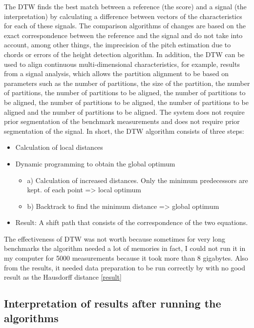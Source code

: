 \documentclass{article}
\begin{document}
 The DTW finds the best match between a reference (the score) and a signal (the interpretation) by calculating a difference between vectors of the characteristics for each of these signals. The comparison algorithms of changes are based on the exact correspondence between the reference and the signal and do not take into account, among other things, the imprecision of the pitch estimation due to chords or errors of the height detection algorithm. In addition, the DTW can be used to align continuous multi-dimensional characteristics, for example, results from a signal analysis, which allows the partition alignment to be based on parameters such as the number of partitions, the size of the partition, the number of partitions, the number of partitions to be aligned, the number of partitions to be aligned, the number of partitions to be aligned, the number of partitions to be aligned and the number of partitions to be aligned.
The system does not require prior segmentation of the benchmark measurements and does not require prior segmentation of the
signal.
In short, the DTW algorithm consists of three steps:

\begin{itemize}
    \item Calculation of local distances
    \item Dynamic programming to obtain the global optimum \begin{itemize}
        \item a) Calculation of increased distances. Only the minimum predecessors are kept. of each point => local optimum
        \item b) Backtrack to find the minimum distance => global optimum
    \end{itemize}
    \item Result: A shift path that consists of the correspondence of the two equations.
\end{itemize}

The effectiveness of DTW was not worth because sometimes for very long benchmarks the algorithm needed a lot of memories in fact, I could not run it in my computer for 5000 measurements because it took more than 8 gigabytes.
Also from the results, it needed data preparation to be run correctly by with no good result as the Hausdorff distance \ref{result}

\subsection{Interpretation of results after running the algorithms}
\end{document}
